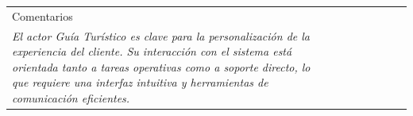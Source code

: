 \begin{table}[H]
    \begin{tabular}{llllllll}
    \cline{1-1}
    \multicolumn{1}{|l|}{\cellcolor[HTML]{F2F2F2}Comentarios}                                                                                                                                                                                                                                                                      &  &  &  &  &  &  &  \\ \cline{1-1}
    \multicolumn{1}{|p{15cm}|}{{\color[HTML]{CCCCCC} \textit{El actor Guía Turístico es clave para la personalización de la experiencia del cliente. Su interacción con el sistema está orientada tanto a tareas operativas como a soporte directo, lo que requiere una interfaz intuitiva y herramientas de comunicación eficientes.}}} &  &  &  &  &  &  &  \\ \cline{1-1}
    \end{tabular}
    \end{table}